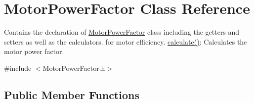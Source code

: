 \hypertarget{class_motor_power_factor}{}\section{Motor\+Power\+Factor Class Reference}
\label{class_motor_power_factor}


Contains the declaration of \hyperlink{class_motor_power_factor}{Motor\+Power\+Factor} class including the getters and setters as well as the calculators. for motor efficiency. \hyperlink{class_motor_power_factor_ac9d5742db4a371bc4e15d5b29d335b6e}{calculate()}\+: Calculates the motor power factor.  




{\ttfamily \#include $<$Motor\+Power\+Factor.\+h$>$}

\subsection*{Public Member Functions}
